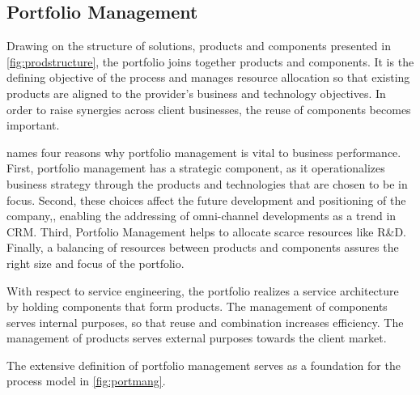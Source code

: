 	
	
	
	\subsection{Portfolio Management}
		\label{sec:portmang}
		
		Drawing on the structure of solutions, products and components presented in \Fig \ref{fig:prodstructure}, the portfolio joins together products and components. It is the defining objective of the process and manages resource allocation so that existing products are aligned to the provider's business and technology objectives. In order to raise synergies across client businesses, the reuse of components becomes important. 
		
		\cite{cooper1999new} names four reasons why portfolio management is vital to business performance. First, portfolio management has a strategic component, as it operationalizes business strategy through the products and technologies that are chosen to be in focus. Second, these choices affect the future development and positioning of the company,\eg, enabling the addressing of omni-channel developments as a trend in \acrshort{CRM}. Third, Portfolio Management helps to allocate scarce resources like R\&D. Finally, a balancing of resources between products and components assures the right size and focus of the portfolio.     
		
		With respect to service engineering, the portfolio realizes a service architecture  \citep{Bohmann2006} by holding components that form products. The management of components serves internal purposes, so that reuse and combination increases efficiency. The management of products serves external purposes towards the client market. 
		
		The extensive definition of portfolio management \citep[]{cooper1999new} serves as a foundation for the process model in \Fig \ref{fig:portmang}. 

